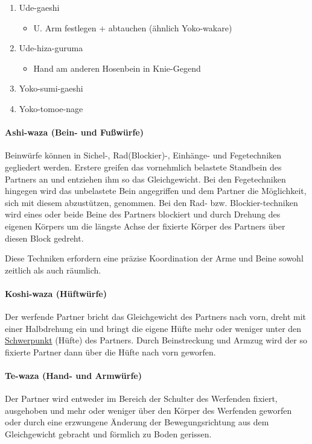 \documentclass[justified, a4paper, notitlepage, captions=tableheading, nobib]{tufte-handout}
\begin{document}
\begin{itemize}
\begin{enumerate}
\begin{itemize}
\end{itemize}
\item Ude-gaeshi
\begin{itemize}
\item U. Arm festlegen + abtauchen (ähnlich Yoko-wakare)
\end{itemize}
\item Ude-hiza-guruma
\begin{itemize}
\item Hand am anderen Hosenbein in Knie-Gegend
\end{itemize}
\item Yoko-sumi-gaeshi
\item Yoko-tomoe-nage
\end{enumerate}
\end{itemize}

\paragraph{\label{org89f7763}Ashi-waza (Bein- und Fußwürfe) }
\label{sec:org4b5e0ee}
Beinwürfe können in Sichel-, Rad(Blockier)-, Einhänge- und Fegetechniken gegliedert werden. Erstere greifen das vornehmlich belastete Standbein des Partners an und entziehen ihm so das Gleichgewicht. Bei den Fegetechniken hingegen wird das unbelastete Bein angegriffen und dem Partner die Möglichkeit, sich mit diesem abzustützen, genommen. Bei den Rad- bzw. Blockier-techniken wird eines oder beide Beine des Partners blockiert und durch Drehung des eigenen Körpers um die längste Achse der fixierte Körper des Partners über diesen Block gedreht. 

Diese Techniken erfordern eine präzise Koordination der Arme und Beine sowohl zeitlich als auch räumlich.

\paragraph{\label{org60c5854}Koshi-waza (Hüftwürfe) }
\label{sec:org46ab7d3}
Der werfende Partner bricht das Gleichgewicht des Partners nach vorn, dreht mit einer Halbdrehung ein und bringt die eigene Hüfte mehr oder weniger unter den \hyperref[org8fdad0e]{Schwerpunkt} (Hüfte) des Partners. Durch Beinstreckung und Armzug wird der so fixierte Partner dann über die Hüfte nach vorn geworfen.

\paragraph{\label{org3eb21a0}Te-waza (Hand- und Armwürfe) }
\label{sec:org0b2e784}
Der Partner wird entweder im Bereich der Schulter des Werfenden fixiert, ausgehoben und mehr oder weniger über den Körper des Werfenden geworfen oder durch eine erzwungene Änderung der Bewegungsrichtung aus dem Gleichgewicht gebracht und förmlich zu Boden gerissen.
\end{document}
